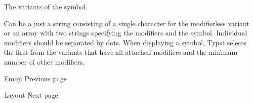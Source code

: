 The variants of the symbol.

Can be a just a string consisting of a single character for the
modifierless variant or an array with two strings specifying the
modifiers and the symbol. Individual modifiers should be separated by
dots. When displaying a symbol, Typst selects the first from the
variants that have all attached modifiers and the minimum number of
other modifiers.

\href{/docs/reference/symbols/emoji/}{\pandocbounded{}}

{ Emoji } { Previous page }

\href{/docs/reference/layout/}{\pandocbounded{}}

{ Layout } { Next page }
